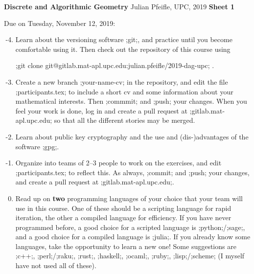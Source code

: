 \documentclass[11pt]{amsart}
\newcommand{\alert}[1]{\textbf{\color{red}#1}}
\begin{document}
\begin{center}
\textbf{\sffamily
   Discrete and Algorithmic Geometry }
 \hfill
 Julian Pfeifle,
   UPC, 2019
\hfill
   \textbf{\sffamily Sheet 1}
 \end{center}

  \bigskip
 \begin{center}
  \color{blue}Due on Tuesday, November 12, 2019:
\end{center}


\begin{enumerate}
  \setcounter{enumi}{-5}
\item
  Learn about the versioning software ;git;, and practice until you become comfortable using it.
  Then check out the repository of this course using
  \begin{center}
    ;git clone git@gitlab.mat-apl.upc.edu:julian.pfeifle/2019-dag-upc; .
  \end{center}

  \medskip
\item
  Create a new branch ;your-name-cv; in the repository, and edit the file ;participants.tex; to include a short cv and some information about your mathematical interests.
  Then ;commmit; and ;push; your changes. When you feel your work is done, log in and create a pull request at ;gitlab.mat-apl.upc.edu; so that all the different stories may be merged.
  
  \medskip
\item
  Learn about public key cryptography and the use and (dis-)advantages of the software ;gpg;.

  \medskip
\item
  Organize into teams of 2--3 people to work on the exercises, and
  edit  ;participants.tex; to reflect this.
  As always, ;commit; and ;push; your changes, and create a pull request at ;gitlab.mat-apl.upc.edu;.

  \medskip
\item
  Read up on \alert{two} programming languages of your choice that your team will use in this course.
  One of these should be a scripting language for rapid iteration, the other a compiled language for efficiency.
  If you have never programmed before, a good choice for a scripted language is ;python;/;sage;, and a good choice for a compiled language is ;julia;.
  If you already know some languages, take the opportunity to learn a new one! Some suggestions are ;c++;, ;perl;/;raku;, ;rust;, ;haskell;, ;ocaml;, ;ruby;, ;lisp;/;scheme;
  (I myself have not used all of these).
\end{enumerate}
\end{document}

